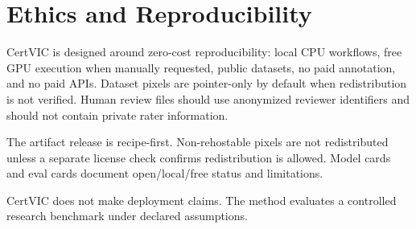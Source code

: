 \section{Ethics and Reproducibility}

CertVIC is designed around zero-cost reproducibility: local CPU workflows, free
GPU execution when manually requested, public datasets, no paid annotation, and
no paid APIs. Dataset pixels are pointer-only by default when redistribution is
not verified. Human review files should use anonymized reviewer identifiers and
should not contain private rater information.

The artifact release is recipe-first. Non-rehostable pixels are not redistributed
unless a separate license check confirms redistribution is allowed. Model cards
and eval cards document open/local/free status and limitations.

CertVIC does not make deployment claims. The method evaluates a controlled
research benchmark under declared assumptions.


